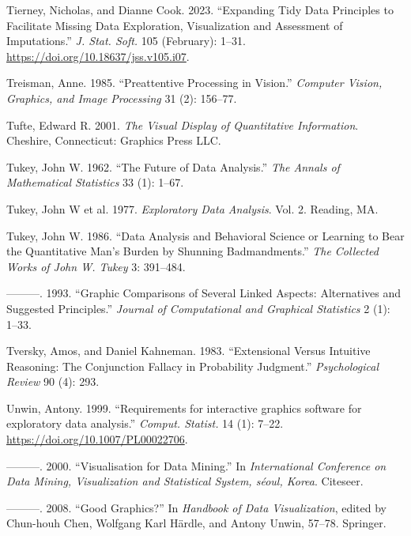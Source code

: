 \documentclass[
  openany]{book}
\newlength{\cslhangindent}
\newenvironment{CSLReferences}[2] %
 {\begin{list}{}{%
  \setlength{\itemindent}{0pt}
  \setlength{\leftmargin}{0pt}
  \setlength{\parsep}{0pt}
  \ifodd #1
   \setlength{\leftmargin}{\cslhangindent}
   \setlength{\itemindent}{-1\cslhangindent}
  \fi
  \setlength{\itemsep}{#2\baselineskip}}}
 {\end{list}}
\theoremstyle{definition}
\theoremstyle{definition}
\theoremstyle{definition}
\theoremstyle{definition}
\theoremstyle{remark}
\begin{document}
\begin{CSLReferences}{1}{0}
Tierney, Nicholas, and Dianne Cook. 2023. {``{Expanding Tidy Data Principles to Facilitate Missing Data Exploration, Visualization and Assessment of Imputations}.''} \emph{J. Stat. Soft.} 105 (February): 1--31. \url{https://doi.org/10.18637/jss.v105.i07}.

Treisman, Anne. 1985. {``Preattentive Processing in Vision.''} \emph{Computer Vision, Graphics, and Image Processing} 31 (2): 156--77.

Tufte, Edward R. 2001. \emph{The Visual Display of Quantitative Information}. Cheshire, Connecticut: Graphics Press LLC.

Tukey, John W. 1962. {``The Future of Data Analysis.''} \emph{The Annals of Mathematical Statistics} 33 (1): 1--67.

Tukey, John W et al. 1977. \emph{Exploratory Data Analysis}. Vol. 2. Reading, MA.

Tukey, John W. 1986. {``Data Analysis and Behavioral Science or Learning to Bear the Quantitative Man's Burden by Shunning Badmandments.''} \emph{The Collected Works of John W. Tukey} 3: 391--484.

---------. 1993. {``Graphic Comparisons of Several Linked Aspects: Alternatives and Suggested Principles.''} \emph{Journal of Computational and Graphical Statistics} 2 (1): 1--33.

Tversky, Amos, and Daniel Kahneman. 1983. {``Extensional Versus Intuitive Reasoning: The Conjunction Fallacy in Probability Judgment.''} \emph{Psychological Review} 90 (4): 293.

Unwin, Antony. 1999. {``{Requirements for interactive graphics software for exploratory data analysis}.''} \emph{Comput. Statist.} 14 (1): 7--22. \url{https://doi.org/10.1007/PL00022706}.

---------. 2000. {``Visualisation for Data Mining.''} In \emph{International Conference on Data Mining, Visualization and Statistical System, s{é}oul, Korea}. Citeseer.

---------. 2008. {``Good Graphics?''} In \emph{Handbook of Data Visualization}, edited by Chun-houh Chen, Wolfgang Karl Härdle, and Antony Unwin, 57--78. Springer.


\end{CSLReferences}
\end{document}

